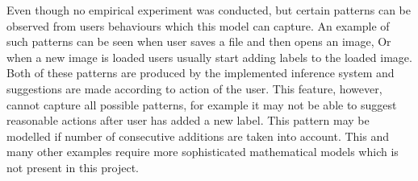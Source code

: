 Even though no empirical experiment was conducted, but certain patterns can be observed from users behaviours which this model can capture. An example of such patterns can be seen when user saves a file and then opens an image, Or when a new image is loaded users usually start adding labels to the loaded image. Both of these patterns are produced by the implemented inference system and suggestions are made according to action of the user.
This feature, however, cannot capture all possible patterns, for example it may not be able to suggest reasonable actions after user has added a new label. This pattern may be modelled if number of consecutive additions are taken into account. This and many other examples require more sophisticated mathematical models which is not present in this project.
